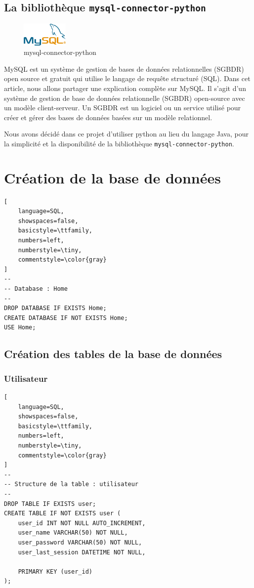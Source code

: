 \subsection*{La bibliothèque \texttt{mysql-connector-python}}
\begin{figure} %
    \centering
    \includegraphics[width=0.20\textwidth]{Figures/mysql.png}
    \caption{mysql-connector-python}
\end{figure}
MySQL est un système de gestion de bases de données relationnelles (SGBDR) open source et gratuit qui utilise le langage de requête structuré (SQL).
Dans cet article, nous allons partager une explication complète sur MySQL. Il s'agit d'un système de gestion de base de données relationnelle (SGBDR) open-source avec un modèle client-serveur.  Un SGBDR est un logiciel ou un service utilisé pour créer et gérer des bases de données basées sur un modèle relationnel.

Nous avons décidé dans ce projet d'utiliser python au lieu du langage Java, pour la simplicité et la disponibilité de la bibliothèque \texttt{mysql-connector-python}.

\section{Création de la base de données}
\begin{lstlisting}[
    language=SQL,
    showspaces=false,
    basicstyle=\ttfamily,
    numbers=left,
    numberstyle=\tiny,
    commentstyle=\color{gray}
]
--
-- Database : Home
--
DROP DATABASE IF EXISTS Home;
CREATE DATABASE IF NOT EXISTS Home;
USE Home;
\end{lstlisting}

\subsection{Création des tables de la base de données}
\subsubsection*{Utilisateur}
\begin{lstlisting}[
    language=SQL,
    showspaces=false,
    basicstyle=\ttfamily,
    numbers=left,
    numberstyle=\tiny,
    commentstyle=\color{gray}
]
--
-- Structure de la table : utilisateur
--
DROP TABLE IF EXISTS user;
CREATE TABLE IF NOT EXISTS user (
    user_id INT NOT NULL AUTO_INCREMENT,
    user_name VARCHAR(50) NOT NULL,
    user_password VARCHAR(50) NOT NULL,
    user_last_session DATETIME NOT NULL,

    PRIMARY KEY (user_id)
);
\end{lstlisting}

